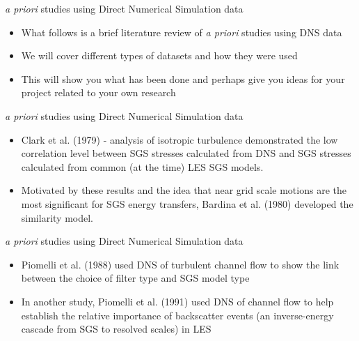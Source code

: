 
\begin{frame}{\textit{a priori} studies using Direct Numerical Simulation data}
\begin{itemize}
	\item What follows is a brief literature review of \textit{a priori} studies using DNS data
	\item We will cover different types of datasets and how they were used
	\item This will show you what has been done and perhaps give you ideas for your project related to your own research
\end{itemize}
\end{frame}


\begin{frame}{\textit{a priori} studies using Direct Numerical Simulation data}
\begin{itemize}
	\item Clark et al. (1979) - analysis of isotropic turbulence demonstrated the low correlation level between SGS stresses calculated from DNS and SGS stresses calculated from common (at the time) LES SGS models.
	\item Motivated by these results and the idea that near grid scale motions are the most significant for SGS energy transfers, Bardina et al. (1980) developed the similarity model. 
\end{itemize}
\end{frame}


\begin{frame}{\textit{a priori} studies using Direct Numerical Simulation data}
\begin{itemize}
	\item Piomelli et al. (1988) used DNS of turbulent channel flow to show the link between the choice of filter type and SGS model type
	\item In another study, Piomelli et al. (1991) used DNS of channel flow to help establish the relative importance of backscatter events (an inverse-energy cascade from SGS to resolved scales) in LES
\end{itemize}
\end{frame}


